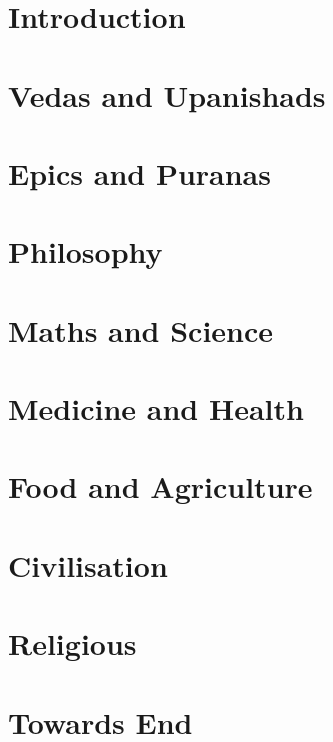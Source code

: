 \section[Intro]{Introduction}




\section[Vedas]{Vedas and Upanishads}







\section[Epics]{Epics and Puranas}




\section[Epics]{Philosophy}


\section[Sci]{Maths and Science}





\section[Health]{Medicine and Health}



\section[Food]{Food and Agriculture}



\section[Civil]{Civilisation}



\section[Religion]{Religious}




\section[End]{Towards End}



